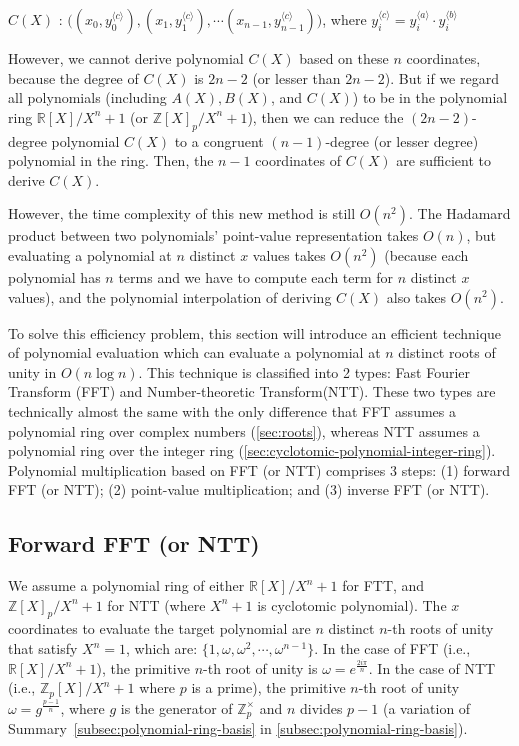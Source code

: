 $C(X)$ : $\bm ( ({x}_0, {y}_0^{\langle c \rangle}), ({x}_1, {y}_1^{\langle c \rangle}), \cdots ({x}_{n-1}, {y}_{n-1}^{\langle c \rangle}) \bm )$, where ${y}_i^{\langle c \rangle} = {y}_i^{\langle a \rangle} \cdot {y}_i^{\langle b \rangle}$

However, we cannot derive polynomial $C(X)$ based on these $n$ coordinates, because the degree of $C(X)$ is $2n-2$ (or lesser than $2n-2$). But if we regard all polynomials (including $A(X), B(X)$, and $C(X)$) to be in the polynomial ring $\mathbb{R}[X]/ X^n + 1$ (or $\mathbb{Z}[X]_p/ X^n + 1$), then we can reduce the $(2n-2)$-degree polynomial $C(X)$ to a congruent $(n-1)$-degree (or lesser degree) polynomial in the ring. Then, the $n-1$ coordinates of $C(X)$ are sufficient to derive $C(X)$. 

However, the time complexity of this new method is still $O(n^2)$. The Hadamard product between two polynomials' point-value representation takes $O(n)$, but evaluating a polynomial at $n$ distinct $x$ values takes $O(n^2)$ (because each polynomial has $n$ terms and we have to compute each term for $n$ distinct $x$ values), and the polynomial interpolation of deriving $C(X)$ also takes $O(n^2)$. 

To solve this efficiency problem, this section will introduce an efficient technique of polynomial evaluation which can evaluate a polynomial at $n$ distinct roots of unity in $O(n \log n)$. This technique is classified into 2 types: Fast Fourier Transform (FFT) and Number-theoretic Transform(NTT). These two types are technically almost the same with the only difference that FFT assumes a polynomial ring over complex numbers (\autoref{sec:roots}), whereas NTT assumes a polynomial ring over the integer ring (\autoref{sec:cyclotomic-polynomial-integer-ring}). Polynomial multiplication based on FFT (or NTT) comprises 3 steps: (1) forward FFT (or NTT); (2) point-value multiplication; and (3) inverse FFT (or NTT). 

\subsection{Forward FFT (or NTT)}
\label{subsec:ntt-forward}

We assume a polynomial ring of either $\mathbb{R}[X]/ X^n + 1$ for FTT, and $\mathbb{Z}[X]_p/ X^n + 1$ for NTT (where $X^n + 1$ is cyclotomic polynomial). The $x$ coordinates to evaluate the target polynomial are $n$ distinct $n$-th roots of unity that satisfy $X^n = 1$, which are: $\{1, \omega, \omega^2, \cdots, \omega^{n-1}\}$. In the case of FFT (i.e., $\mathbb{R}[X] / X^n + 1$), the primitive $n$-th root of unity is $\omega = e^{\frac{2i\pi}{n}}$. In the case of NTT (i.e., $\mathbb{Z}_p[X] / X^n + 1$ where $p$ is a prime), the primitive $n$-th root of unity $\omega = g^{\frac{p-1}{n}}$, where $g$ is the generator of $\mathbb{Z}^{\times}_p$ and $n$ divides $p - 1$ (a variation of Summary~\ref*{subsec:polynomial-ring-basis} in \autoref{subsec:polynomial-ring-basis}). 

